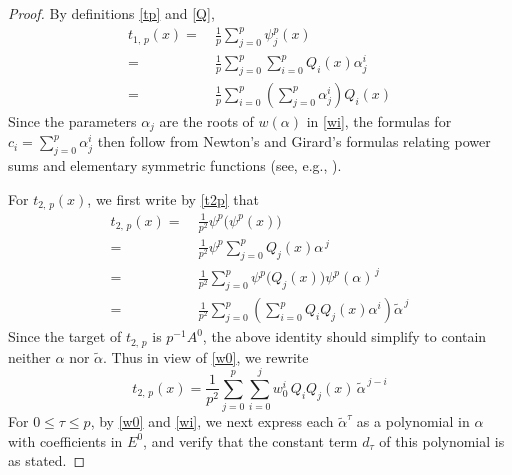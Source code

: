 \documentclass{gtpart}
\theoremstyle{definition}
\theoremstyle{remark}
\newcommand{\A}{\alpha}
\newcommand{\T}{\tau}
\renewcommand{\=}{\approx}
\renewcommand{\-}{\sim}
\numberwithin{equation}{section}
\numberwithin{thm}{section}
\begin{document}
\begin{proof}
 By definitions \eqref{tp} and \eqref{Q}, 
 \begin{equation*}
  \begin{split}
   t_{1,\,p}(x) = & ~ \frac{1}{p} \sum_{j = 0}^p \psi^p_j(x) \\
                = & ~ \frac{1}{p} \sum_{j = 0}^p \sum_{i = 0}^p Q_i(x) \A_j^i \\
                = & ~ \frac{1}{p} \sum_{i = 0}^p \left( \sum_{j = 0}^p 
                    \A_j^i \right) Q_i(x) 
  \end{split}
 \end{equation*}
 Since the parameters $\A_j$ are the roots of $w(\A)$ in \eqref{wi}, the 
 formulas for $c_i = \sum_{j=0}^p \A_j^i$ then follow from Newton's and Girard's 
 formulas relating power sums and elementary symmetric functions (see, e.g., 
 \cite[Problem 16-A]{cc}).  

 For $t_{2,\,p}(x)$, we first write by \eqref{t2p} that 
 \begin{equation*}
  \begin{split}
   t_{2,\,p}(x) = & ~ \frac{1}{p^2} \psi^p \big( \psi^p(x) \big) \\
                = & ~ \frac{1}{p^2} \psi^p \sum_{j = 0}^p Q_j(x) \A^{\,j} \\
                = & ~ \frac{1}{p^2} \sum_{j = 0}^p \psi^p \big( Q_j(x) \big) 
                  \psi^p(\A)^{\,j} \\
                = & ~ \frac{1}{p^2} \sum_{j = 0}^p \left( \sum_{i = 0}^p 
                  Q_i Q_j(x) \A^i \right) \widetilde{\A}^{\,j} 
  \end{split}
 \end{equation*}
 Since the target of $t_{2,\,p}$ is $p^{-1} A^0$, the above identity should 
 simplify to contain neither $\A$ nor $\widetilde{\A}$.  Thus in view of 
 \eqref{w0}, we rewrite 
 \[
  t_{2,\,p}(x) = \frac{1}{p^2} \sum_{j = 0}^p \sum_{i = 0}^j w_0^i \, Q_i Q_j(x) 
  \, \widetilde{\A}^{\,j - i} 
 \]
 For $0 \leq \T \leq p$, by \eqref{w0} and \eqref{wi}, we next express each 
 $\widetilde{\A}^\T$ as a polynomial in $\A$ with coefficients in $E^0$, and 
 verify that the constant term $d_\T$ of this polynomial is as stated.  


\end{proof}
\end{document}
